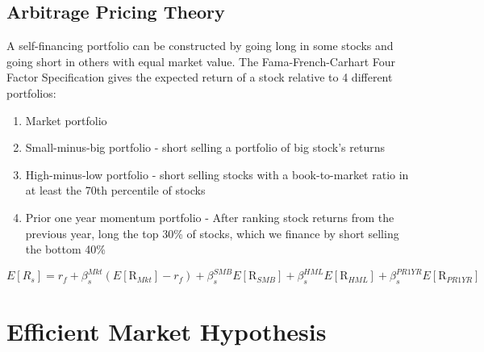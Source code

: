 \documentclass[11pt]{article}
\theoremstyle{definition}
\begin{document}
\subsection{Arbitrage Pricing Theory}
A self-financing portfolio can be constructed by going long in some stocks and going short in others with equal market value. The Fama-French-Carhart Four Factor Specification gives the expected return of a stock relative to 4 different portfolios: 
\begin{enumerate}
    \item Market portfolio
    \item Small-minus-big portfolio - short selling a portfolio of big stock's returns
    \item High-minus-low portfolio - short selling stocks with a book-to-market ratio in at least the 70th percentile of stocks
    \item Prior one year momentum portfolio - After ranking stock returns from the previous year, long the top 30\% of stocks, which we finance by short selling the bottom 40\%
\end{enumerate}
\begin{equation*}
    E\left[R_s\right]=r_f+\beta_s^{M k t}\left(E\left[\mathrm{R}_{M k t}\right]-r_f\right)+\beta_s^{S M B} E\left[\mathrm{R}_{S M B}\right]+\beta_s^{H M L} E\left[\mathrm{R}_{H M L}\right]+\beta_s^{P R 1 Y R} E\left[\mathrm{R}_{P R 1 Y R}\right]
\end{equation*}

\section{Efficient Market Hypothesis}
\end{document}
